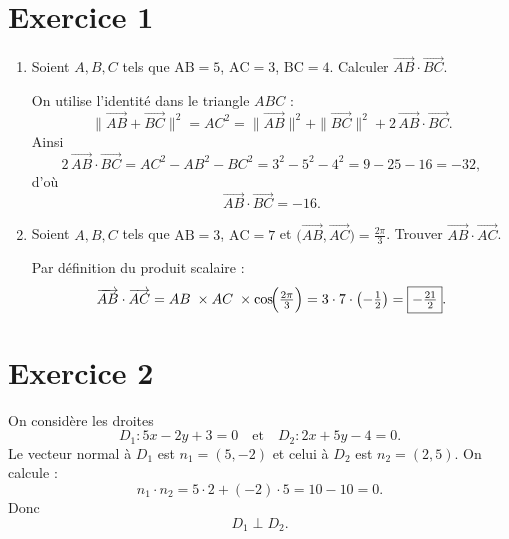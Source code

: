 \documentclass{article}
\theoremstyle{definition}
\begin{document}
\section*{Exercice 1}
\begin{enumerate}
  \item Soient \(A,B,C\) tels que \(\mathrm{AB}=5\), \(\mathrm{AC}=3\), \(\mathrm{BC}=4\). Calculer 
  \(\overrightarrow{AB}\cdot\overrightarrow{BC}\).
  
  On utilise l'identité dans le triangle \(ABC\) :
  \[
    \|\overrightarrow{AB} + \overrightarrow{BC}\|^2
    = AC^2
    = \|\overrightarrow{AB}\|^2 + \|\overrightarrow{BC}\|^2 + 2\,\overrightarrow{AB}\cdot\overrightarrow{BC}.
  \]
  Ainsi
  \[
    2\,\overrightarrow{AB}\cdot\overrightarrow{BC}
    = AC^2 - AB^2 - BC^2
    = 3^2 - 5^2 - 4^2
    = 9 - 25 - 16
    = -32,
  \]
  d'où
  \[
    \boxed{\overrightarrow{AB}\cdot\overrightarrow{BC} = -16.}
  \]
  
  \item Soient \(A,B,C\) tels que \(\mathrm{AB}=3\), \(\mathrm{AC}=7\) et 
  \(\bigl(\overrightarrow{AB},\overrightarrow{AC}\bigr)=\tfrac{2\pi}{3}\). 
  Trouver \(\overrightarrow{AB}\cdot\overrightarrow{AC}\).
  
  Par définition du produit scalaire :
  \[
    \overrightarrow{AB}\cdot\overrightarrow{AC}
    = AB\;\times AC\;\times \cos\!\Bigl(\tfrac{2\pi}{3}\Bigr)
    = 3\cdot7\cdot\bigl(-\tfrac12\bigr)
    = \boxed{-\tfrac{21}{2}}.
  \]
\end{enumerate}

\section*{Exercice 2}
On considère les droites  
\[
D_1:5x-2y+3=0
\quad\text{et}\quad
D_2:2x+5y-4=0.
\]
Le vecteur normal à \(D_1\) est \(n_1=(5,-2)\) et celui à \(D_2\) est \(n_2=(2,5)\).  
On calcule :
\[
n_1 \cdot n_2 = 5\cdot2 + (-2)\cdot5 = 10 -10 = 0.
\]
Donc 
\[
\boxed{D_1 \perp D_2.}
\]
\end{document}
